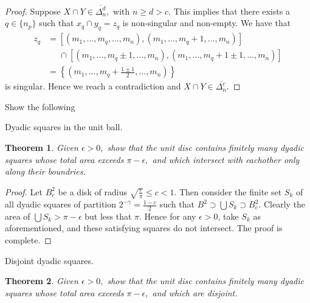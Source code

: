 \documentclass[letter]{article}
\newtheorem{theorem}{Theorem}
\newenvironment{menumerate}{%
  \edef\backupindent{\the\parindent}%
  \enumerate%
  \setlength{\parindent}{\backupindent}%
}{\endenumerate}
\begin{document}
\begin{menumerate}
\begin{menumerate}
\begin{proof}
					Suppose $X \cap Y \in \overline{\Delta_n^d},$ with $n \geq d > c$.  This implies that there exists a $q \in \{n_p\}$ such that $x_q \cap y_q = z_q$ is non-singular and non-empty. We have that
					\begin{equation*}
						\begin{aligned}
							z_q &= [(m_1,\dots,m_q,\dots,m_n), (m_1,\dots,m_q+1,\dots,m_n)]\\
								&\;\;\;\;\; \cap  [(m_1,\dots,m_q \pm 1,\dots,m_n), (m_1,\dots,m_q+1 \pm 1,\dots,m_n)] \\
								&= \left\{\left(m_1,\dots,m_q+\frac{1\pm1}{2},\dots,m_n  \right)\right\}
						\end{aligned}
					\end{equation*}
					is singular. Hence we reach a contradiction and $X\cap Y \in \overline{\Delta_n^c}. $

 				\end{proof}
		\end{menumerate} 


		\item Show the following
			\begin{menumerate}
			\item Dyadic squares in the unit ball.
				\begin{theorem}
				Given $\epsilon > 0,$ show that the unit disc contains finitely many dyadic squares whose total area exceeds $\pi - \epsilon,$ and which intersect with eachother only along their boundries.
				\end{theorem}

				\begin{proof}
				     Let $B_c^2$ be a disk of radius $\sqrt{\frac{\epsilon}{\pi}} \leq c < 1$. Then consider the finite set $S_k$ of all dyadic squares of partition $2^{-\gamma} = \frac{1 - c}{2}$ such that $B^2 \supset \bigcup S_k \supset B_c^2$. Clearly the area of $\bigcup S_k > \pi - \epsilon$ but less that $\pi.$ Hence for any $\epsilon > 0$, take $S_k$ as aforementioned, and these satisfying squares do not intersect. The proof is complete.
				\end{proof}

			\item Disjoint dyadic squares.
				\begin{theorem}
				Given $\epsilon > 0,$ show that the unit disc contains finitely many dyadic squares whose total area exceeds $\pi - \epsilon,$ and which are disjoint.
				\end{theorem}


\end{menumerate}
\end{menumerate}
\end{document}
